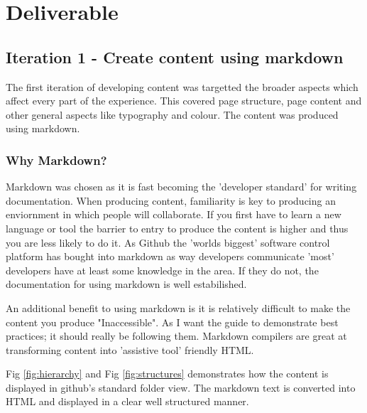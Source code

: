 \section{Deliverable}
\subsection{Iteration 1 - Create content using markdown}
The first iteration of developing content was targetted the broader aspects
which affect every part of the experience. This covered page structure,
page content and other general aspects like typography and colour. The content was produced
using markdown.

\subsubsection{Why Markdown?}
Markdown was chosen as it is fast becoming the 'developer standard' for writing
documentation. When producing content, familiarity is key to producing an
enviornment in which people will collaborate. If you first have to
learn a new language or tool the barrier to entry to produce the content is
higher and thus you are less likely to do it. As Github the 'worlds biggest'
software control platform has bought into markdown as way developers communicate
'most' developers have at least some knowledge in the area. If they do not,
the documentation for using markdown is well estabilished.

An additional benefit to using markdown is it is relatively difficult to make
the content you produce "Inaccessible". As I want the guide to demonstrate
best practices; it should really be following them. Markdown compilers are
great at transforming content into 'assistive tool' friendly HTML.

Fig \ref{fig:hierarchy} and Fig \ref{fig:structures} demonstrates how the
content is displayed in github's standard folder view. The markdown text is
converted into HTML and displayed in a clear well structured manner.

